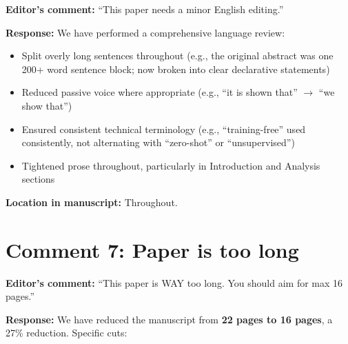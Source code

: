 \documentclass[11pt]{article}
\begin{document}
\textbf{Editor's comment:} ``This paper needs a minor English editing.''

\textbf{Response:} We have performed a comprehensive language review:
\begin{itemize}[leftmargin=*]
\item Split overly long sentences throughout (e.g., the original abstract was one 200+ word sentence block; now broken into clear declarative statements)
\item Reduced passive voice where appropriate (e.g., ``it is shown that'' $\to$ ``we show that'')
\item Ensured consistent technical terminology (e.g., ``training-free'' used consistently, not alternating with ``zero-shot'' or ``unsupervised'')
\item Tightened prose throughout, particularly in Introduction and Analysis sections
\end{itemize}

\textbf{Location in manuscript:} Throughout.

\section*{Comment 7: Paper is too long}

\textbf{Editor's comment:} ``This paper is WAY too long. You should aim for max 16 pages.''

\textbf{Response:} We have reduced the manuscript from \textbf{22 pages to 16 pages}, a 27\% reduction. Specific cuts:
\end{document}
